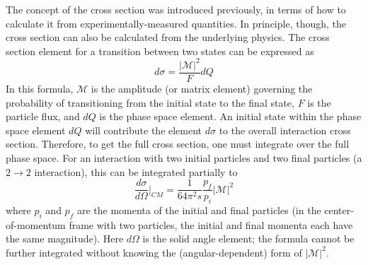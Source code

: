 The concept of the cross section was introduced previously, 
in terms of how to calculate it from experimentally-measured 
quantities.  
In principle, though, the cross section 
can also be calculated from the underlying physics.  
The cross section element for a transition 
between two states can be expressed as 
\[
d \sigma = \frac{ \left| \mathcal{M} \right| ^2 }{F} d Q
\]
In this formula, $\mathcal{M}$ is the amplitude 
(or matrix element) governing the probability of 
transitioning from the initial state to the final state, 
$F$ is the particle flux, and $d Q$ is the 
phase space element.  
An initial state within the phase space element $d Q$ will 
contribute the element $d \sigma$ to the overall 
interaction cross section.  
Therefore, to get the full cross section, one must integrate 
over the full phase space.  
For an interaction with two initial particles and 
two final particles 
(a $2 \rightarrow 2$ interaction), 
this can be integrated partially to 
\[
\frac{d \sigma}{d \Omega} \bigg| _{CM} 
= \frac{1}{64 \pi^2 s} \frac{p_f}{p_i} \left| \mathcal{M} \right| ^2
\]
where $p_i$ and $p_f$ are the momenta of the initial and final particles 
(in the center-of-momentum frame with two particles, 
the initial and final momenta each have the same magnitude).  
Here $d \Omega$ is the solid angle element; 
the formula cannot be further integrated without knowing the 
(angular-dependent) form of $ \left| \mathcal{M} \right| ^2 $.  



